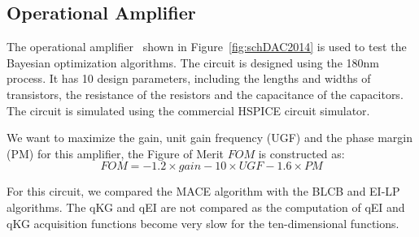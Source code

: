 
\subsection{Operational Amplifier}


The operational amplifier~\cite{wang2014enabling} shown in
Figure~\ref{fig:schDAC2014} is used to test the Bayesian optimization algorithms. The circuit is designed
using the 180nm process. It has 10 design parameters, including the lengths
and widths of transistors, the resistance of the resistors and the capacitance of the
capacitors. The circuit is simulated using the commercial HSPICE circuit simulator.

We want to maximize the gain, unit gain frequency (UGF) and the phase margin (PM) for this amplifier, the Figure of Merit $FOM$ is constructed as:
$$
\mathit{FOM} = -1.2 \times \mathit{gain} - 10 \times \mathit{UGF} - 1.6 \times \mathit{PM}
$$

For this circuit, we compared the MACE algorithm with the BLCB and EI-LP
algorithms. The qKG and qEI are not compared as the computation of qEI and qKG
acquisition functions become very slow for the ten-dimensional functions.


